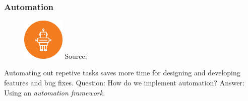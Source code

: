 \begin{frame}
  \frametitle{Automation}
  \begin{figure}[htpb]
      \raggedleft
      \includegraphics[width=2cm]{images/robot-icon.eps}
      \newline
      {\tiny Source: \cite{robot_icon}}
  \end{figure}

  Automating out repetive tasks saves more time for designing and developing features and bug fixes.
  \newline
  \newline
  Question: How do we implement automation?
  \pause
  \newline
  \newline
  Answer: Using an {\it automation framework}.

\end{frame}

